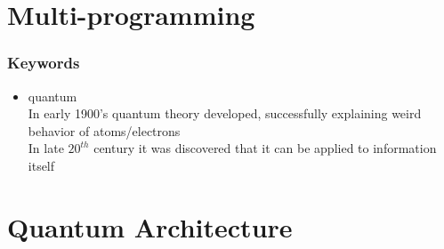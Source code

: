\documentclass[xcolor=x11names,table]{beamer}
\begin{document}
\section{Multi-programming}
	\begin{frame}[allowframebreaks]
		\frametitle{Keywords}
		\begin{itemize}
			\item quantum
			{\scriptsize \\ In early 1900's quantum theory developed, successfully explaining weird behavior of atoms/electrons
				\\ In late $20^{th}$ century it was discovered that it can be applied to information itself}
		\end{itemize}
	\end{frame}

\section{Quantum Architecture}
\end{document}
